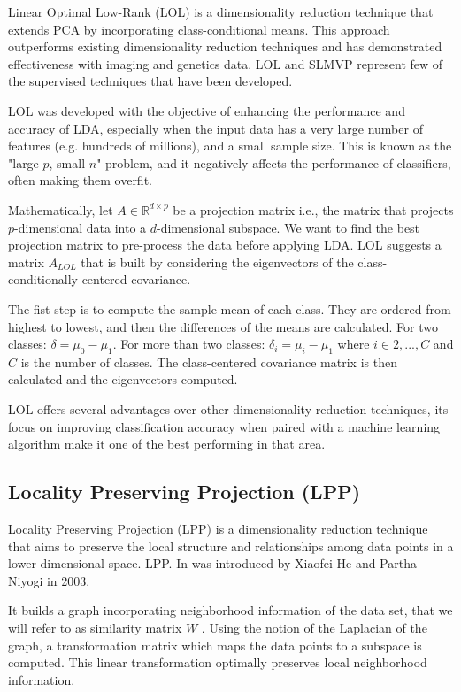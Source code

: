 Linear Optimal Low-Rank (LOL) \cite{lol} is a dimensionality reduction technique that extends PCA by incorporating class-conditional means. This approach outperforms existing dimensionality reduction techniques and has demonstrated effectiveness with imaging and genetics data. LOL and SLMVP represent few of the supervised techniques that have been developed.

LOL was developed with the objective of enhancing the performance and accuracy of LDA, especially when the input data has a very large number of features (e.g. hundreds of millions), and a small sample size. This is known as the "large $p$, small $n$" problem, and it negatively affects the performance of classifiers, often making them overfit.

Mathematically, let $A \in \mathbb{R}^{d \times p}$ be a projection matrix i.e., the matrix that projects $p$-dimensional data into a $d$-dimensional subspace. We want to find the best projection matrix to pre-process the data before applying LDA. LOL suggests a matrix $A_{LOL}$ that is built by considering the eigenvectors of the class-conditionally centered covariance.

The fist step is to compute the sample mean of each class. They are ordered from highest to lowest, and then the differences of the means are calculated. For two classes: $\delta = \mu_0 - \mu_1$. For more than two classes: $\delta_i = \mu_i - \mu_1$ where $i \in {2,...,C}$ and $C$ is the number of classes. The class-centered covariance matrix is then calculated and the eigenvectors computed.

LOL offers several advantages over other dimensionality reduction techniques, its focus on improving classification accuracy when paired with a machine learning algorithm make it one of the best performing in that area.

\subsection{Locality Preserving Projection (LPP)}

Locality Preserving Projection (LPP) \cite{lpp} is a dimensionality reduction technique that aims to preserve the local structure and relationships among data points in a lower-dimensional space. LPP. In was introduced by Xiaofei He and Partha Niyogi in 2003.

It builds a graph incorporating neighborhood information
of the data set, that we will refer to as similarity matrix $W$ . Using the notion of the Laplacian of the graph, a transformation matrix which maps the data points to a subspace is computed. This linear transformation optimally preserves local neighborhood information.

